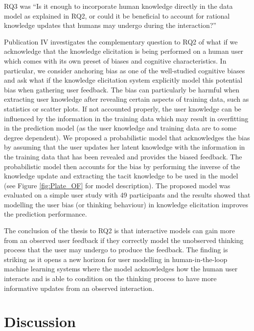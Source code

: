 \documentclass[dissertation,math,vertlayout,pdfa,colorlinks]{aaltoseries}
\begin{document}
RQ3 was ``Is it enough to incorporate human knowledge directly in the data model as explained in RQ2, or could it be beneficial to account for rational knowledge updates that humans may undergo during the interaction?''

Publication IV investigates the complementary question to RQ2 of what if we acknowledge that the knowledge elicitation is being performed on a human user which comes with its own preset of biases and cognitive characteristics. In particular, we consider anchoring bias as one of the well-studied cognitive biases \cite{Tversky1974} and ask what if the knowledge elicitation system explicitly model this potential bias when gathering user feedback. The bias can particularly be harmful when extracting user knowledge after revealing certain aspects of training data, such as statistics or scatter plots. If not accounted properly, the user knowledge can be influenced by the information in the training data which may result in overfitting in the prediction model (as the user knowledge and training data are to some degree dependent). We proposed a probabilistic model that acknowledges the bias by assuming that the user updates her latent knowledge with the information in the training data that has been revealed and provides the biased feedback. The probabilistic model then accounts for the bias by performing the inverse of the knowledge update and extracting the tacit knowledge to be used in the model (see Figure \ref{fig:Plate_OF} for model description). The proposed model was evaluated on a simple user study with 49 participants and the results showed that modelling the user bias (or thinking behaviour) in knowledge elicitation improves the prediction performance.

The conclusion of the thesis to RQ2 is that interactive models can gain more from an observed user feedback if they correctly model the unobserved thinking process that the user may undergo to produce the feedback. The finding is striking as it opens a new horizon for user modelling in human-in-the-loop machine learning systems where the model acknowledges how the human user interacts and is able to condition on the thinking process to have more informative updates from an observed interaction.

\section{Discussion}
\end{document}
